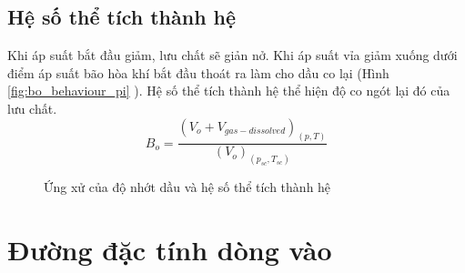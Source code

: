 \documentclass[12pt,a4paper]{report}
\begin{document}
\subsection{Hệ số thể tích thành hệ}
Khi áp suất bắt đầu giảm, lưu chất sẽ giản nở. Khi áp suất vỉa giảm xuống dưới điểm áp suất bão hòa khí bắt đầu thoát ra làm cho dầu co lại (Hình \ref{fig:bo_behaviour_pi} \cite{ahmed2006reservoir}). Hệ số thể tích thành hệ thể hiện độ co ngót lại đó của lưu chất.
	\begin{equation}
		B_o = \dfrac{(V_o+V_{gas-dissolved})_{(p, T)}}{(V_o)_{(p_{sc}, T_{sc})}}
	\end{equation}
\newpage
	\begin{figure}[h]
		\centering
		\hfill
		\hfill
		\caption{Ứng xử của độ nhớt dầu và hệ số thể tích thành hệ}
	\end{figure}

\section{Đường đặc tính dòng vào}
\end{document}
